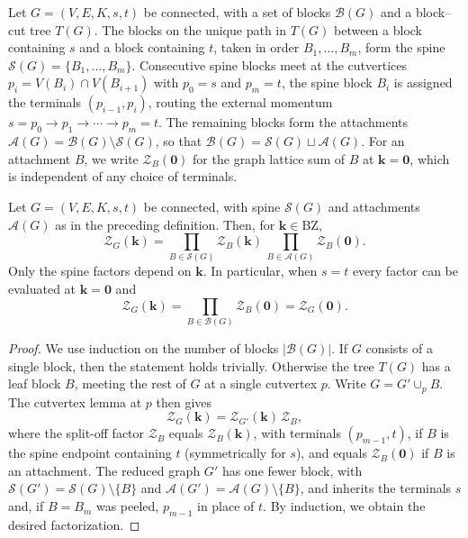 \documentclass[]{amsart}
\numberwithin{mythm}{section}
\begin{document}
\begin{definition}
Let $G=(V,E,K,s,t)$ be connected, with a set of blocks $\mathcal B(G)$ and a block--cut tree $T(G)$. The blocks on the unique path in $T(G)$ between a block containing $s$ and a block containing $t$, taken in order $B_1,\dots,B_m$, form the spine $\mathcal S(G)=\{B_1,\dots,B_m\}$. Consecutive spine blocks meet at the cutvertices $p_i=V(B_i)\cap V(B_{i+1})$ with $p_0=s$ and $p_m=t$, the spine block $B_i$ is assigned the terminals $(p_{i-1},p_i)$, routing the external momentum $s=p_0\to p_1\to\cdots\to p_m=t$. The remaining blocks form the attachments $\mathcal A(G)=\mathcal B(G)\setminus\mathcal S(G)$, so that $\mathcal B(G)=\mathcal S(G)\sqcup\mathcal A(G)$. For an attachment $B$, we write $\mathcal Z_B(\bm0)$ for the graph lattice sum of $B$ at $\bm k=\bm0$, which is independent of any choice of terminals.
\end{definition}

\begin{theorem}
    \label{thm:block_factorization}
Let $G=(V,E,K,s,t)$ be connected, with spine $\mathcal S(G)$ and attachments $\mathcal A(G)$ as in the preceding definition. Then, for $\bm k\in\mathrm{BZ}$,
\[
\mathcal Z_G(\bm k)
=\prod_{B\in\mathcal S(G)}\mathcal Z_B(\bm k)\,
 \prod_{B\in\mathcal A(G)}\mathcal Z_B(\bm0).
\]
Only the spine factors depend on $\bm k$. In particular, when $s=t$ every factor can be evaluated at $\bm k=\bm0$ and
\[
\mathcal Z_G(\bm k)=\prod_{B\in\mathcal B(G)}\mathcal Z_B(\bm0)=\mathcal Z_G(\bm 0).
\]
\end{theorem}

\begin{proof}
We use induction on the number of blocks $|\mathcal B(G)|$. If $G$ consists of a single block, then the statement holds trivially. Otherwise the tree $T(G)$ has a leaf block $B$, meeting the rest of $G$ at a single cutvertex $p$. Write $G=G'\cup_p B$. The cutvertex lemma at $p$ then gives
\[
{\mathcal Z}_G(\bm k)={\mathcal Z}_{G'}(\bm k)\,{\mathcal Z}_B ,
\]
where the split-off factor ${\mathcal Z}_B$ equals ${\mathcal Z}_B(\bm k)$, with terminals $(p_{m-1},t)$, if $B$ is the spine endpoint containing $t$ (symmetrically for $s$), and equals ${\mathcal Z}_B(\bm0)$ if $B$ is an attachment. The reduced graph $G'$ has one fewer block, with $\mathcal S(G')=\mathcal S(G)\setminus\{B\}$ and $\mathcal A(G')=\mathcal A(G)\setminus\{B\}$, and inherits the terminals $s$ and, if $B=B_m$ was peeled, $p_{m-1}$ in place of $t$. By induction, we obtain the desired factorization.
\end{proof}
\end{document}
